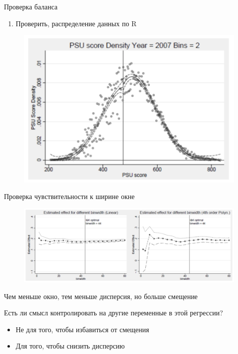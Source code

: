 \begin{frame}{Проверка баланса}
    \begin{enumerate}
        \item Проверить, распределение данных по R
    \end{enumerate}
    \begin{figure}
        \centering
        \includegraphics[width=\textwidth]{Images/rdd_density.png}
    \end{figure}
\end{frame}

\begin{frame}{Проверка чувствительности к ширине окне}
    \begin{figure}
        \centering
        \includegraphics[width=\textwidth]{Images/rdd_sensitivity.png}
    \end{figure}
    Чем меньше окно, тем меньше дисперсия, но больше смещение
\end{frame}




\begin{frame}{Есть ли смысл контролировать на другие переменные в этой регрессии?}
\begin{itemize}
    \item Не для того, чтобы избавиться от смещения
    \item Для того, чтобы снизить дисперсию
\end{itemize}
\end{frame}

